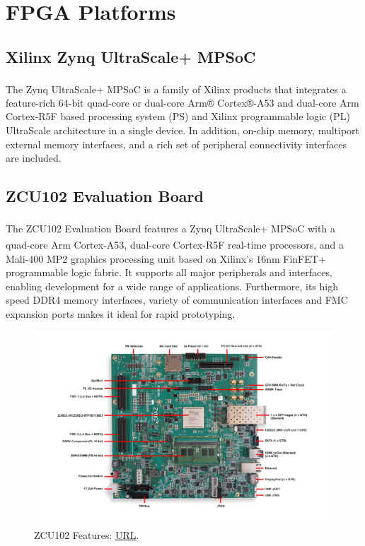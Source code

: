 \section{FPGA Platforms}

\subsection{Xilinx Zynq UltraScale+ MPSoC}
The Zynq\textsuperscript{\textregistered} UltraScale+\texttrademark{} MPSoC is a family of Xilinx products that integrates a feature-rich 64-bit quad-core or dual-core Arm® Cortex®-A53 and dual-core Arm Cortex-R5F based processing system (PS) and Xilinx programmable logic (PL) UltraScale architecture in a single device. In addition, on-chip memory, multiport external memory interfaces, and a rich set of peripheral connectivity interfaces are included. \cite{Zynq_UltraScale_overview}

\subsection{ZCU102 Evaluation Board}
The ZCU102 Evaluation Board features a Zynq\textsuperscript{\textregistered} UltraScale+\texttrademark{} MPSoC with a quad-core Arm\textsuperscript{\textregistered} Cortex\textsuperscript{\textregistered}-A53, dual-core Cortex-R5F real-time processors, and a Mali\texttrademark{}-400 MP2 graphics processing unit based on Xilinx's 16nm FinFET+ programmable logic fabric. It supports all major peripherals and interfaces, enabling development for a wide range of applications. Furthermore, its high speed DDR4 memory interfaces, variety of communication interfaces and FMC expansion ports makes it ideal for rapid prototyping. 

\begin{figure}[H]
    \centering
        \includegraphics[width=1\textwidth]{Images/Hardware/zcu102.jpg}
        \decoRule
        \caption[ZCU102]{ZCU102 Features: \href{https://www.xilinx.com/products/boards-and-kits/ek-u1-zcu102-g.html\#information}{URL}.}
        \label{fig:ZCU102}
\end{figure}

